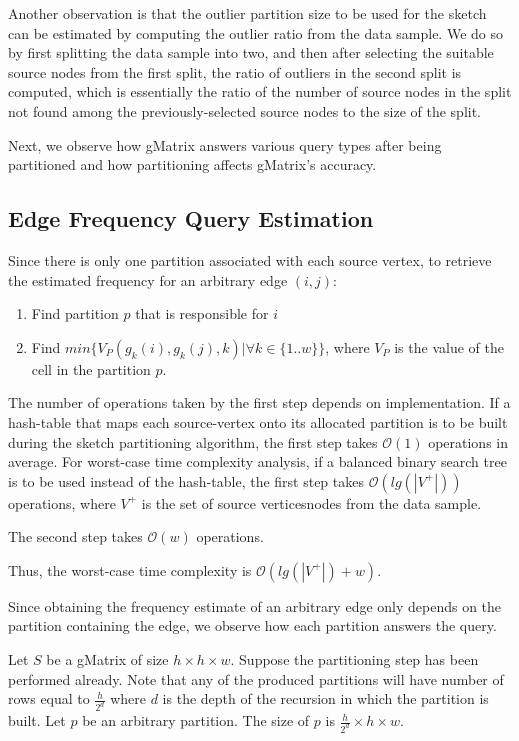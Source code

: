 Another observation is that the outlier partition size to be used for the sketch can be estimated by computing the outlier ratio from the data sample. We do so by first splitting the data sample into two, and then after selecting the suitable source nodes from the first split, the ratio of outliers in the second split is computed, which is essentially the ratio of the number of source nodes in the split not found among the previously-selected source nodes to the size of the split.

Next, we observe how gMatrix answers various query types after being partitioned and how partitioning affects gMatrix's accuracy.

\subsection{Edge Frequency Query Estimation}

Since there is only one partition associated with each source vertex, to retrieve the estimated frequency for an arbitrary edge $(i,j)$:

\begin{enumerate}
  \item Find partition $p$ that is responsible for $i$
  \item Find $min\{V_P(g_k(i),g_k(j),k)|\forall k \in \{1..w\}\}$, where $V_P$ is the value of the cell in the partition $p$. 
\end{enumerate}

The number of operations taken by the first step depends on implementation. If a hash-table that maps each source-vertex onto its allocated partition is to be built during the sketch partitioning algorithm, the first step takes $\mathcal{O}(1)$ operations in average. For worst-case time complexity analysis, if a balanced binary search tree is to be used instead of the hash-table, the first step takes $\mathcal{O}(lg(|V^{+}|))$ operations, where $V^{+}$ is the set of source verticesnodes from the data sample.

The second step takes $\mathcal{O}(w)$ operations.

Thus, the worst-case time complexity is $\mathcal{O}(lg(|V^{+}|) + w)$.

Since obtaining the frequency estimate of an arbitrary edge only depends on the partition containing the edge, we observe how each partition answers the query.

Let $S$ be a gMatrix of size $h\times h\times w$. Suppose the partitioning step has been performed already. Note that any of the produced partitions will have number of rows equal to $\frac{h}{2^d}$ where $d$ is the depth of the recursion in which the partition is built. Let $p$ be an arbitrary partition. The size of $p$ is $\frac{h}{2^d}\times h\times w$.

